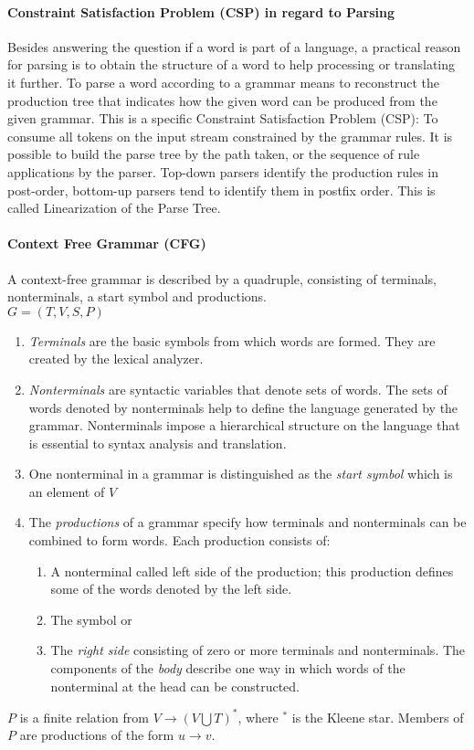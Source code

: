 \paragraph{Constraint Satisfaction Problem (CSP) in regard to Parsing} 
Besides answering the question if a word is part of a language, a practical reason for parsing is to obtain the structure of a word to help processing or translating it further. To parse a word according to a grammar means to reconstruct the production tree that indicates how the given word can be produced from the given grammar. This is a specific Constraint Satisfaction Problem (CSP): To consume all tokens on the input stream constrained by the grammar rules. It is possible to build the parse tree by the path taken, or the sequence of rule applications by the parser.  Top-down parsers identify the production rules in post-order, bottom-up parsers tend to identify them in postfix order. This is called Linearization of the Parse Tree. \cite{ParserBook}

\paragraph{Context Free Grammar (CFG)}
A context-free grammar is described by a quadruple, consisting of terminals, nonterminals, a start symbol and productions.\\
$G = (T, V, S, P)$
\begin{enumerate}
	\item \emph{Terminals} are the basic symbols from which words are formed.  They are created by the lexical analyzer.
	\item \emph{Nonterminals} are syntactic variables that denote sets of words. The sets of words denoted by nonterminals help to define the language generated by the grammar. Nonterminals impose a hierarchical structure on the language that is essential to syntax analysis and translation.
	\item One nonterminal in a grammar is distinguished as the \emph{start symbol} which is an element of $V$
	\item The \emph{productions} of a grammar specify how terminals and nonterminals can be combined to form words. Each production consists of:
	\begin{enumerate}
		\item A nonterminal called left side of the production; this production defines some of the words denoted by the left side.
		\item The symbol \code{$\rightarrow$}  or  \code{::=} 
		\item The \emph{right side} consisting of zero or more terminals and nonterminals. The components of the \emph{body} describe one way in which words of the nonterminal at the head can be constructed.
	\end{enumerate}
\end{enumerate}
 $P$ is a finite relation from $V \rightarrow (V  \bigcup  T)^*$, where $^*$ is the Kleene star. Members of $P$ are productions of the form $u \rightarrow v$. \cite{DragonBook}

